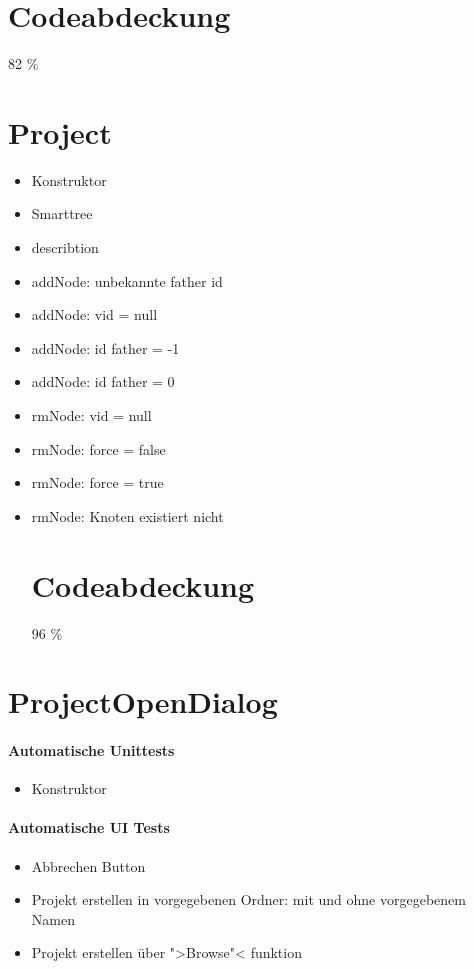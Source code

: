 \section{Codeabdeckung}
82 \%
\section{Project}
\begin{itemize}
\paragraph{Automatische Unittests}
\item Konstruktor
\item Smarttree
\item describtion
\item addNode: unbekannte father id
\item addNode: vid = null
\item addNode: id father = -1
\item addNode: id father = 0
\item rmNode: vid = null
\item rmNode: force = false
\item rmNode: force = true
\item rmNode: Knoten existiert nicht
\section{Codeabdeckung}
96 \%
\end{itemize}
\section{ProjectOpenDialog}
\paragraph{Automatische Unittests}
\begin{itemize}
\item Konstruktor
\end{itemize}
\paragraph{Automatische UI Tests}
\begin{itemize}
\item Abbrechen Button
\item Projekt erstellen in vorgegebenen Ordner: mit und ohne vorgegebenem Namen
\item Projekt erstellen über ">Browse"< funktion
\end{itemize}
